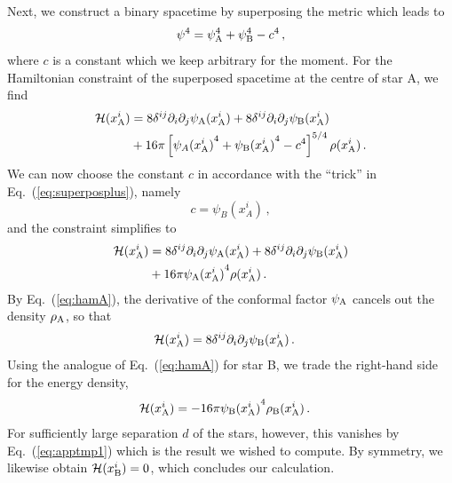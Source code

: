 \documentclass[]{iopart}
\begin{document}
Next, we construct a binary spacetime by superposing the metric
which leads to
%
\begin{equation}
    \psi^4 = \psi_{\rm A}^4 + \psi_{\rm B}^4-c^4\,,
\end{equation}
%
where $c$ is a constant which we keep arbitrary for the moment.
For the Hamiltonian constraint of the superposed spacetime at the
centre of star A, we find
%
\begin{equation}
\begin{aligned}
    \mathcal{H}(x_{\rm A}^{i}) &=  8 \delta^{ij}
    \partial_i\partial_j{\psi_{\rm A}({x_{\rm A}^{i}})} + 8 \delta^{ij}
    \partial_i\partial_j{\psi_{\rm B}({x_{\rm A}^{i}})}\\ &
    +  16\pi \left[{\psi_{A}({x_{\rm A}^{i}})}^4
    + {\psi_{\rm B}({x_{\rm A}^{i}})}^4-c^4\right]^{5/4}\rho(x_{\rm A}^{i})\,.
\end{aligned}
\end{equation}
%
We can now choose the constant $c$ in accordance with the ``trick''
in Eq.~(\ref{eq:superposplus}), namely
%
\begin{equation}
   c = \psi_B(x_A^{i})\,,
\end{equation}
%
and the constraint simplifies to
%
\begin{equation}
\begin{aligned}
    \mathcal{H}(x_{\rm A}^{i}) &=
    8 \delta^{ij} \partial_i\partial_j{\psi_{\rm A}({x_{\rm A}^{i}})}
    + 8 \delta^{ij} \partial_i\partial_j{\psi_{\rm B}({x_{\rm A}^{i}})}\\ &
    +  16\pi {\psi_{\rm A}({x_{\rm A}^{i}})}^4 \rho(x_{\rm A}^{i})\,.
\end{aligned}
\end{equation}
%
By Eq.~(\ref{eq:hamA}), the derivative of the conformal factor
$\psi_{\rm A}$ cancels out the density $\rho_{\rm A}$, so that
%
\begin{equation}
\begin{aligned}
  \mathcal{H}(x_{\rm A}^{i}) &=
  8 \delta^{ij} \partial_i\partial_j{\psi_{\rm B}({x_{\rm A}^{i}})}\,.
\end{aligned}
\end{equation}
%
Using the analogue of Eq.~(\ref{eq:hamA}) for star B, we trade the
right-hand side for the energy density,
%
\begin{equation}
\begin{aligned}
  \mathcal{H}(x_{\rm A}^{i}) &=   - 16\pi {\psi_{\rm B}({x_{\rm A}^{i}})}^4
  \rho_{\rm B}(x_{\rm A}^{i})\,.
\end{aligned}
\end{equation}
%
For sufficiently large separation $d$ of the stars, however, this
vanishes by Eq.~(\ref{eq:apptmp1}) which is the result we wished
to compute. By symmetry, we likewise obtain $\mathcal{H}(x_{\rm
B}^i)=0$, which concludes our calculation.
\end{document}
